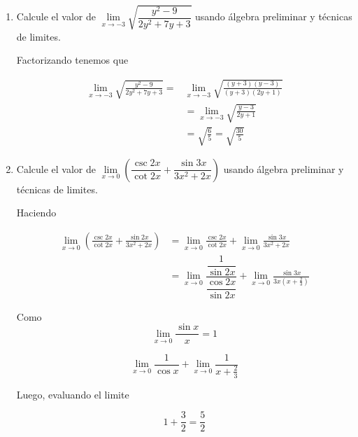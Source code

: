 \documentclass[a4paper,12pt]{report}
\begin{document}
\begin{enumerate}
\newpage

\item Calcule el valor de $\lim\limits_{x \to -3} \sqrt{\dfrac{y^2 -9}{2y^2 +7y +3}}$ usando álgebra preliminar y técnicas de limites.\\
\vspace{0.5cm}

Factorizando tenemos que

\begin{align*}
\lim_{x \to -3} \sqrt{\frac{y^2 -9}{2y^2 +7y +3}} = & \lim_{x \to -3} \sqrt{\frac{(y+3)(y-3)}{(y+3)(2y+1)}} 
\\ & = \lim_{x \to -3} \sqrt{\frac{y-3}{2y+1}}
\\ & = \sqrt{\frac{6}{5}} = \sqrt{\frac{30}{5}}
\end{align*}

\item Calcule el valor de $\lim\limits_{x \to 0} (\dfrac{\csc 2x}{\cot 2x} + \dfrac{\sin 3x}{3x^2 +2x}) $ usando álgebra preliminar y técnicas de limites.\\

\vspace{0.5cm}

Haciendo

\begin{align*}
\lim_{x \to 0} (\frac{\csc 2x}{\cot 2x} + \frac{\sin 2x}{3x^2 +2x}) & = \lim_{x \to 0} \frac{\csc 2x}{\cot 2x} + \lim_{x \to 0} \frac{\sin 3x}{3x^2 +2x}
\\ & = \lim_{x \to 0} \dfrac{\dfrac{1}{\sin 2x}}{\dfrac{\cos 2x}{\sin 2x}} + \lim_{x \to 0} \frac{\sin 3x}{3x(x+ \frac{2}{3})}
\end{align*}

Como \[\lim_{x \to 0} \dfrac{\sin x}{x} = 1\]

\[\lim_{x \to 0} \frac{1}{\cos x} + \lim_{x \to 0} \frac{1}{x+ \frac{2}{3}}\]

Luego, evaluando el limite 

\[
	1 + \frac{3}{2} = \frac{5}{2}
\]



\end{enumerate}
\end{document}
